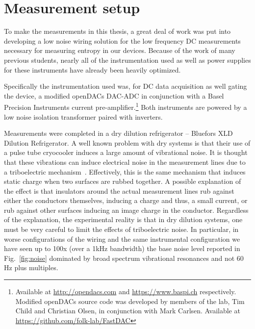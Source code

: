 \chapter{Measurement setup}

To make the measurements in this thesis, a great deal of work was put into developing a low noise wiring solution for the low frequency DC measurements necessary for measuring entropy in our devices. Because of the work of many previous students, nearly all of the instrumentation used as well as power supplies for these instruments have already been heavily optimized. 

Specifically the instrumentation used was, for DC data acquisition as well gating the device, a modified openDACs DAC-ADC in conjunction with a Basel Precision Instruments current pre-amplifier.\footnote{Available at \url{http://opendacs.com} and \url{https://www.baspi.ch} respectively. Modified openDACs source code was developed by members of the lab, Tim Child and Christian Olsen, in conjunction with Mark Carlsen. Available at \url{https://github.com/folk-lab/FastDAC}} Both instruments are powered by a low noise isolation transformer paired with inverters. 

Measurements were completed in a dry dilution refrigerator -- Bluefors XLD Dilution Refrigerator. A well known problem with dry systems is that their use of a pulse tube cryocooler induces a large amount of vibrational noise. It is thought that these vibrations can induce electrical noise in the measurement lines due to a triboelectric mechanism~\cite{pelliccione2013design, kalra2016vibration, mykkanen2016reducing}. Effectively, this is the same mechanism that induces static charge when two surfaces are rubbed together. A possible explanation of the effect is that insulators around the actual measurement lines rub against either the conductors themselves, inducing a charge and thus, a small current, or rub against other surfaces inducing an image charge in the conductor. Regardless of the explanation, the experimental reality is that in dry dilution systems, one must be very careful to limit the effects of triboelectric noise. In particular, in worse configurations of the wiring and the same instrumental configuration we have seen up to 100x (over a 1kHz bandwidth) the base noise level reported in Fig.~\ref{fig:noise} dominated by broad spectrum vibrational resonances and not 60 Hz plus multiples.

